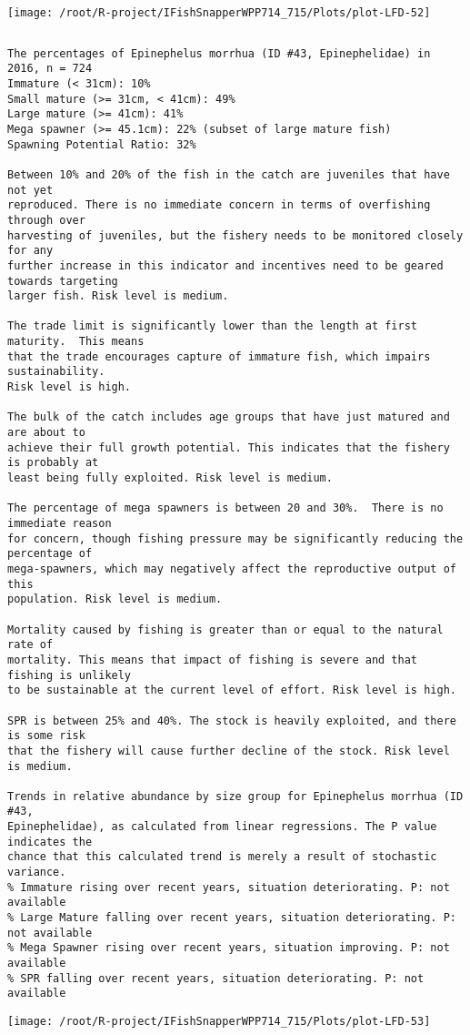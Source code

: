 \documentclass{report}\usepackage[]{graphicx}\usepackage[]{color}
\makeatletter
\def\maxwidth{ %
  \ifdim\Gin@nat@width>\linewidth
    \linewidth
  \else
    \Gin@nat@width
  \fi
}
\newenvironment{kframe}{%
 \def\at@end@of@kframe{}%
 \ifinner\ifhmode%
  \def\at@end@of@kframe{\end{minipage}}%
  \begin{minipage}{\columnwidth}%
 \fi\fi%
 \def\FrameCommand##1{\hskip\@totalleftmargin \hskip-\fboxsep
 \colorbox{shadecolor}{##1}\hskip-\fboxsep
     \hskip-\linewidth \hskip-\@totalleftmargin \hskip\columnwidth}%
 \MakeFramed {\advance\hsize-\width
   \@totalleftmargin\z@ \linewidth\hsize
   \@setminipage}}%
 {\par\unskip\endMakeFramed%
 \at@end@of@kframe}
\newenvironment{knitrout}{}{} %
\makeatother
\begin{document}
\begin{knitrout}
\texttt{[image: /root/R-project/IFishSnapperWPP714\_715/Plots/plot-LFD-52]} 
\begin{kframe}\begin{verbatim}
\end{verbatim}
\end{kframe}
\clearpage
\newpage
\begin{kframe}\begin{verbatim}The percentages of Epinephelus morrhua (ID #43, Epinephelidae) in 2016, n = 724
Immature (< 31cm): 10%
Small mature (>= 31cm, < 41cm): 49%
Large mature (>= 41cm): 41%
Mega spawner (>= 45.1cm): 22% (subset of large mature fish)
Spawning Potential Ratio: 32%
 
Between 10% and 20% of the fish in the catch are juveniles that have not yet
reproduced. There is no immediate concern in terms of overfishing through over
harvesting of juveniles, but the fishery needs to be monitored closely for any
further increase in this indicator and incentives need to be geared towards targeting
larger fish. Risk level is medium.

The trade limit is significantly lower than the length at first maturity.  This means
that the trade encourages capture of immature fish, which impairs sustainability.
Risk level is high.

The bulk of the catch includes age groups that have just matured and are about to
achieve their full growth potential. This indicates that the fishery is probably at
least being fully exploited. Risk level is medium.

The percentage of mega spawners is between 20 and 30%.  There is no immediate reason
for concern, though fishing pressure may be significantly reducing the percentage of
mega-spawners, which may negatively affect the reproductive output of this
population. Risk level is medium.
 
Mortality caused by fishing is greater than or equal to the natural rate of
mortality. This means that impact of fishing is severe and that fishing is unlikely
to be sustainable at the current level of effort. Risk level is high.
 
SPR is between 25% and 40%. The stock is heavily exploited, and there is some risk
that the fishery will cause further decline of the stock. Risk level is medium.
 
Trends in relative abundance by size group for Epinephelus morrhua (ID #43,
Epinephelidae), as calculated from linear regressions. The P value indicates the
chance that this calculated trend is merely a result of stochastic variance.
% Immature rising over recent years, situation deteriorating. P: not available
% Large Mature falling over recent years, situation deteriorating. P: not available
% Mega Spawner rising over recent years, situation improving. P: not available
% SPR falling over recent years, situation deteriorating. P: not available
\end{verbatim}
\end{kframe}
\texttt{[image: /root/R-project/IFishSnapperWPP714\_715/Plots/plot-LFD-53]} 


\end{knitrout}
\end{document}
